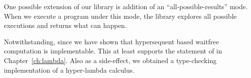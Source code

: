 One possible extension of our library is addition of an ``all-possible-results''
mode.  When we execute a program under this mode, the library explores
all possible executions and returns what can happen.

Notwithstanding, since we have shown that hypersequent based waitfree computation
is implementable.  This at least supports the statement of
 in Chapter~\ref{ch:lambda}.
Also as a side-effect, we obtained a type-checking implementation of a
hyper-lambda calculus.
